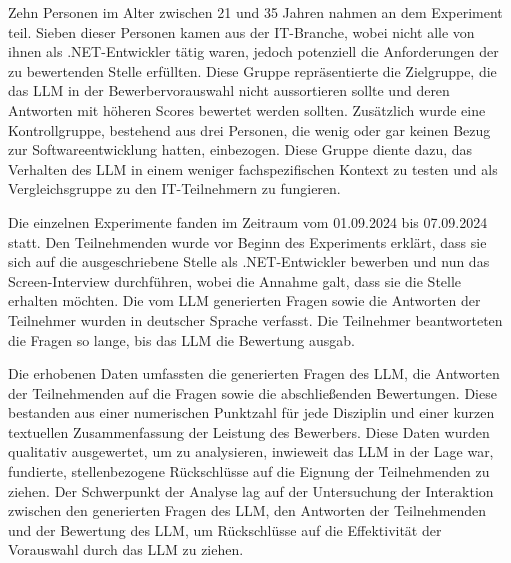 Zehn Personen im Alter zwischen 21 und 35 Jahren nahmen an dem Experiment teil. 
Sieben dieser Personen kamen aus der IT-Branche, wobei nicht alle von ihnen als .NET-Entwickler tätig waren, 
jedoch potenziell die Anforderungen der zu bewertenden Stelle erfüllten. Diese Gruppe 
repräsentierte die Zielgruppe, die das \acs{LLM} in der Bewerbervorauswahl nicht aussortieren sollte und 
deren Antworten mit höheren Scores bewertet werden sollten. Zusätzlich wurde eine Kontrollgruppe, 
bestehend aus drei Personen, die wenig oder gar keinen Bezug zur Softwareentwicklung hatten, einbezogen. 
Diese Gruppe diente dazu, das Verhalten des \acs{LLM} in einem weniger fachspezifischen Kontext zu 
testen und als Vergleichsgruppe zu den IT-Teilnehmern zu fungieren. 


Die einzelnen Experimente fanden im Zeitraum vom 01.09.2024 bis 07.09.2024 statt. Den 
Teilnehmenden wurde vor Beginn des Experiments erklärt, dass sie sich auf die ausgeschriebene 
Stelle als .NET-Entwickler bewerben und nun das Screen-Interview durchführen, wobei die Annahme 
galt, dass sie die Stelle erhalten möchten. Die vom \acs{LLM} generierten Fragen sowie die Antworten der 
Teilnehmer wurden in deutscher Sprache verfasst. Die Teilnehmer beantworteten die Fragen so lange, 
bis das \acs{LLM} die Bewertung ausgab. 


Die erhobenen Daten umfassten die generierten Fragen des \acs{LLM}, die Antworten der Teilnehmenden auf 
die Fragen sowie die abschließenden Bewertungen. Diese bestanden aus einer numerischen Punktzahl 
für jede Disziplin und einer kurzen textuellen Zusammenfassung der Leistung des Bewerbers. 
Diese Daten wurden qualitativ ausgewertet, um zu analysieren, inwieweit das \acs{LLM} in der Lage war, 
fundierte, stellenbezogene Rückschlüsse auf die Eignung der Teilnehmenden zu ziehen. Der 
Schwerpunkt der Analyse lag auf der Untersuchung der Interaktion zwischen den generierten Fragen 
des \acs{LLM}, den Antworten der Teilnehmenden und der Bewertung des \acs{LLM}, um Rückschlüsse auf die 
Effektivität der Vorauswahl durch das \acs{LLM} zu ziehen. 






